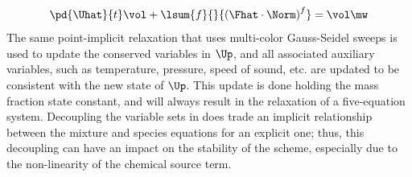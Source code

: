 \begin{equation}
  \pd{\Uhat}{t} \vol + \lsum{f}{}{\left(\Fhat \cdot \Norm\right)^f} = \vol \mw
  \label{dc-flux-part-2}
\end{equation}
The same point-implicit relaxation that uses multi-color Gauss-Seidel sweeps is
used to update the conserved variables in $\Up$, and all associated
auxiliary variables, such as temperature, pressure, speed of sound, etc. are
updated to be consistent with the new state of $\Up$.  This update is done
holding the mass fraction state constant, and will always result in the
relaxation of a five-equation system.  Decoupling the variable sets in
 does trade an implicit relationship between the mixture and
species equations for an explicit one; thus, this decoupling can have an impact
on the stability of the scheme, especially due to the non-linearity of the
chemical source term\cite{park}.
 
